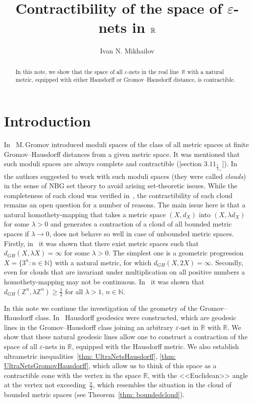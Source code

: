 \documentclass{article}
\title{Contractibility of the space of $\varepsilon$-nets in $\R$}
\author{Ivan N. Mikhailov}
\date{}
\theoremstyle{definition}
\theoremstyle{plain}
\renewcommand{\:}{\colon}
\newcommand{\0}{\emptyset}
\renewcommand{\(}{\rom(}
\renewcommand{\)}{\rom)}
\newcommand{\N}{\mathbb{N}}
\newcommand{\R}{\mathbb{R}}
\newcommand{\Z}{\mathbb{Z}}
\begin{document}
\maketitle

\begin{abstract}
In this note, we show that the space of all $\varepsilon$-nets in the real line~$\R$ with a natural metric, equipped with either Hausdorff or Gromov--Hausdorff distance, is contractible.
\end{abstract}





\section{Introduction}

In~\cite{GromovEng} M.\,Gromov introduced moduli spaces of the class of all metric spaces at finite Gromov--Hausdorff distances from a given metric space. It was mentioned that such moduli spaces are always complete and contractible (\cite{GromovEng}[section $3.11_{\frac{1}{2}_+}$]). In~\cite{BogatyTuzhilin} the authors suggested to work with such moduli spaces (they were called \emph{clouds}) in the sense of NBG set theory to avoid arising set-theoretic issues. While the completeness of each cloud was verified in~\cite{BogatyTuzhilin}, the contractibility of each cloud remains an open question for a number of reasons. The main issue here is that a natural homothety-mapping that takes a metric space $(X, d_X)$ into $(X, \lambda d_X)$ for some $\lambda > 0$ and generates a contraction of a cloud of all bounded metric spaces if $\lambda\to 0$, does not behave so well in case of unbounded metric spaces. Firstly, in~\cite{BogatyTuzhilin} it was shown that there exist metric spaces such that $d_{GH}(X, \lambda X) = \infty$ for some $\lambda > 0$. The simplest one is a geometric progression $X = \{3^n\:n\in\N\}$ with a natural metric, for which $d_{GH}(X, 2X) = \infty$. Secondly, even for clouds that are invariant under multiplication on all positive numbers a homothety-mapping may not be continuous. In~\cite{nglitghclitcotrl} it was shown that $d_{GH}(\Z^n, \lambda \Z^n)\ge \frac{1}{2}$ for all $\lambda > 1$, $n\in\N$.

In this note we continue the investigation of the geometry of the Gromov--Hausdorff class. In~\cite{metrictreesRUS} Hausdorff geodesics were constructed, which are geodesic lines in the Gromov--Hausdorff class joining an arbitrary $\varepsilon$-net in $\R$ with $\R$. We show that these natural geodesic lines allow one to construct a contraction of the space of all $\varepsilon$-nets in $\R$, equipped with the Hausdorff metric. We also establish ultrametric inequalities~\ref{thm: UltraNetsHausdorff}, \ref{thm: UltraNetsGromovHausdorff}, which allow us to think of this space as a contractible cone with the vertex in the space $\R$, with the <<Euclidean>> angle at the vertex not exceeding~$\frac{\pi}{2}$, which resembles the situation in the cloud of bounded metric spaces (see Theorem~\ref{thm: boundedcloud}).
\end{document}
